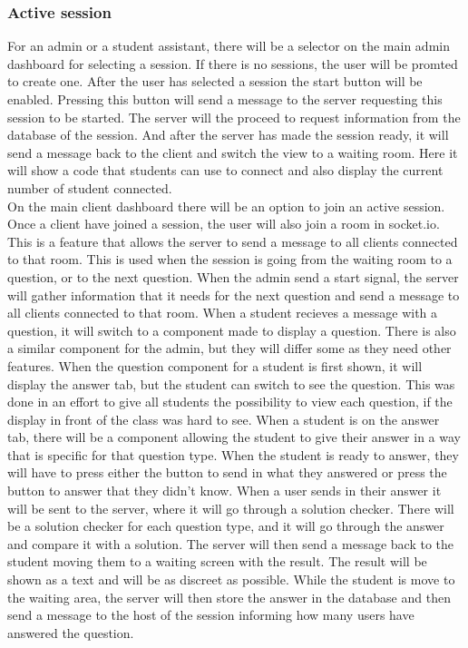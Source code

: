 \subsubsection{Active session}
For an admin or a student assistant, there will be a selector on the main admin dashboard for selecting a session. If there is no sessions, the user will be promted to create one. After the user has selected a session the start button will be enabled. Pressing this button will send a message to the server requesting this session to be started. The server will the proceed to request information from the database of the session. And after the server has made the session ready, it will send a message back to the client and switch the view to a waiting room. Here it will show a code that students can use to connect and also display the current number of student connected. 
\\[11pt]
On the main client dashboard there will be an option to join an active session. Once a client have joined a session, the user will also join a room in socket.io. This is a feature that allows the server to send a message to all clients connected to that room. This is used when the session is going from the waiting room to a question, or to the next question. When the admin send a start signal, the server will gather information that it needs for the next question and send a message to all clients connected to that room. When a student recieves a message with a question, it will switch to a component made to display a question. There is also a similar component for the admin, but they will differ some as they need other features. When the question component for a student is first shown, it will display the answer tab, but the student can switch to see the question. This was done in an effort to give all students the possibility to view each question, if the display in front of the class was hard to see. When a student is on the answer tab, there will be a component allowing the student to give their answer in a way that is specific for that question type. When the student is ready to answer, they will have to press either the button to send in what they answered or press the button to answer that they didn't know. When a user sends in their answer it will be sent to the server, where it will go through a solution checker. There will be a solution checker for each question type, and it will go through the answer and compare it with a solution. The server will then send a message back to the student moving them to a waiting screen with the result. The result will be shown as a text and will be as discreet as possible. While the student is move to the waiting area, the server will then store the answer in the database and then send a message to the host of the session informing how many users have answered the question.
